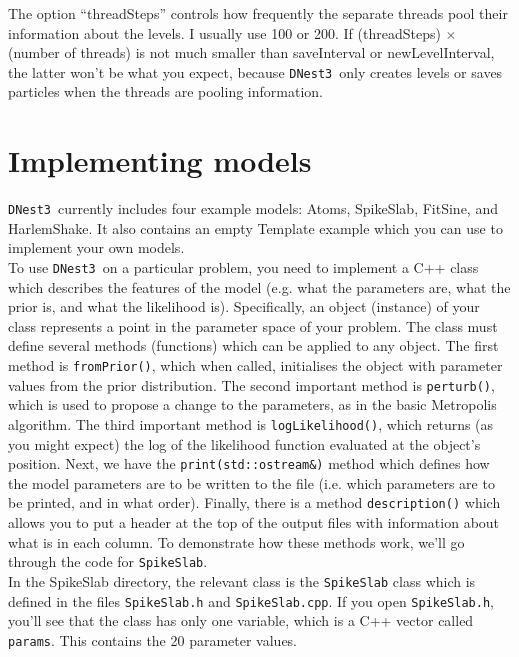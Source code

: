 \documentclass[a4paper, 11pt]{article}
\newcommand{\dnest}{{\tt DNest3}}
\begin{document}
The option ``threadSteps'' controls how frequently the separate threads pool
their information about the levels. I usually use 100 or 200. If
(threadSteps) $\times$ (number of threads) is not much smaller than
saveInterval or newLevelInterval, the latter won't be what you expect, because
\dnest~only creates levels or saves particles when the threads are pooling
information.\\

\section{Implementing models}
\dnest~currently includes four example models: Atoms, SpikeSlab, FitSine, and
HarlemShake. It also contains an empty Template example which you can use
to implement your own models.\\

To use \dnest~on a particular problem, you need to implement a C++ class
which describes the features of the model (e.g. what the parameters are,
what the prior is, and what the likelihood is). Specifically, an object
(instance) of your class represents a point in the parameter space of your
problem. The class must define several methods (functions) which can be
applied to any object. The first method is {\tt fromPrior()}, which when called,
initialises the object with parameter values from the prior distribution.
The second important method is {\tt perturb()}, which is used to propose
a change to the parameters, as in the basic Metropolis algorithm. The third
important method is {\tt logLikelihood()}, which returns (as you might expect)
the log of the likelihood function evaluated at the object's position. Next,
we have the {\tt print(std::ostream\&)} method which defines how the model
parameters are to be written to the file (i.e. which parameters are to be
printed, and in what order). Finally, there is a method {\tt description()}
which allows you to put a header at the top of the output files with information
about what is in each column. To demonstrate how these methods work, we'll go
through the code for {\tt SpikeSlab}.\\

In the SpikeSlab directory,
the relevant class is the {\tt SpikeSlab} class which is defined in the files
{\tt SpikeSlab.h} and {\tt SpikeSlab.cpp}. If you open {\tt SpikeSlab.h},
you'll see that the class has only one variable, which is a C++ vector called
{\tt params}. This contains the 20 parameter values.\\
\end{document}
